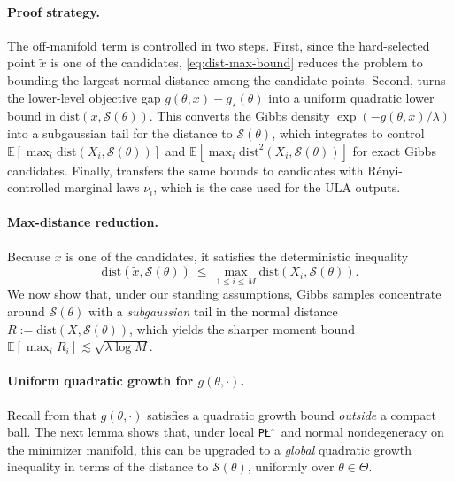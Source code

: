 \documentclass{article}
\theoremstyle{normaltheorem}
\newcommand{\PLcirc}{\texttt{P\L$^\circ$}}
\newcommand{\calS}{\mathcal{S}}
\begin{document}
\paragraph{Proof strategy.}
The off-manifold term is controlled in two steps. First, since the hard-selected point \(\tilde x\) is one of the
candidates, \eqref{eq:dist-max-bound} reduces the problem to bounding the largest normal distance among the candidate
points. Second,  turns the lower-level objective gap \(g(\theta,x)-g_\star(\theta)\) into a
uniform quadratic lower bound in \(\mathrm{dist}(x,\calS(\theta))\). This converts the Gibbs density
\(\exp(-g(\theta,x)/\lambda)\) into a subgaussian tail for the distance to \(\calS(\theta)\), which
 integrates to control
\(\mathbb E[\max_i \mathrm{dist}(X_i,\calS(\theta))]\) and
\(\mathbb E[\max_i \mathrm{dist}^2(X_i,\calS(\theta))]\) for exact Gibbs candidates. Finally,
 transfers the same bounds to candidates with R\'enyi-controlled marginal laws \(\nu_i\), which is the
case used for the ULA outputs.

\paragraph{Max-distance reduction.}
Because $\tilde x$ is one of the candidates, it satisfies the deterministic inequality
\begin{equation}\label{eq:dist-max-bound}
\mathrm{dist}(\tilde x,\calS(\theta))
\ \le\ \max_{1\le i\le M}\mathrm{dist}(X_i,\calS(\theta)).
\end{equation}
We now show that, under our standing assumptions, Gibbs samples concentrate around $\calS(\theta)$ with a \emph{subgaussian} tail in the
normal distance $R:=\mathrm{dist}(X,\calS(\theta))$, which yields the sharper moment bound
$\mathbb E[\max_i R_i]\lesssim \sqrt{\lambda\log M}$.

\paragraph{Uniform quadratic growth for $g(\theta,\cdot)$.}
Recall from  that $g(\theta,\cdot)$ satisfies a quadratic growth bound \emph{outside} a compact ball.
The next lemma shows that, under local \PLcirc\ and normal nondegeneracy on the minimizer manifold, this can be upgraded to a \emph{global}
quadratic growth inequality in terms of the distance to $\calS(\theta)$, uniformly over $\theta\in\Theta$.
\end{document}
